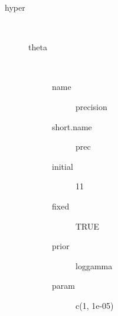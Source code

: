 \begin{description}
	\item[hyper]\ 
	 \begin{description}
	 	\item[theta]\ 
	 	 \begin{description}
	 	 	 \item[ name ] precision 
	 	 	 \item[ short.name ] prec 
	 	 	 \item[ initial ] 11 
	 	 	 \item[ fixed ] TRUE 
	 	 	 \item[ prior ] loggamma 
	 	 	 \item[ param ] c(1, 1e-05) 
	 	 \end{description}
	 \end{description}
\end{description}
